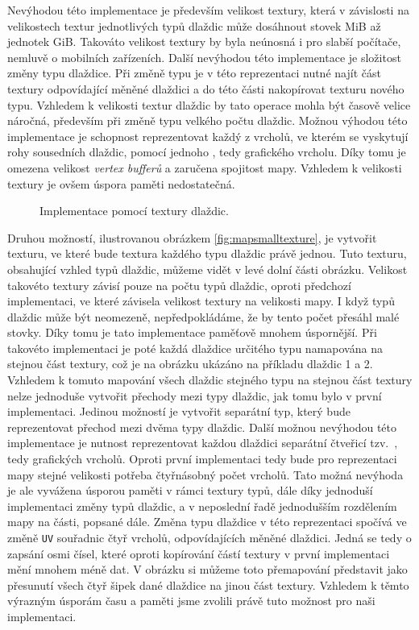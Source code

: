 Nevýhodou této implementace je především velikost textury, která v závislosti na velikostech textur jednotlivých typů dlaždic může dosáhnout stovek MiB až jednotek GiB. Takováto velikost textury by byla neúnosná i pro slabší počítače, nemluvě o mobilních zařízeních. Další nevýhodou této implementace je složitost změny typu dlaždice. Při změně typu je v této reprezentaci nutné najít část textury odpovídající měněné dlaždici a do této části nakopírovat texturu nového typu. Vzhledem k velikosti textur dlaždic by tato operace mohla být časově velice náročná, především při změně typu velkého počtu dlaždic. Možnou výhodou této implementace je schopnost reprezentovat každý z vrcholů, ve kterém se vyskytují rohy sousedních dlaždic, pomocí jednoho , tedy grafického vrcholu. Díky tomu je omezena velikost \textit{vertex bufferů} a zaručena spojitost mapy. Vzhledem k velikosti textury je ovšem úspora paměti nedostatečná.

\begin{figure}[h]
	\centering
	
	\caption{Implementace pomocí textury dlaždic.}
	\label{fig:mapbigtexture}
\end{figure}

Druhou možností, ilustrovanou obrázkem \ref{fig:mapsmalltexture}, je vytvořit texturu, ve které bude textura každého typu dlaždic právě jednou. Tuto texturu, obsahující vzhled typů dlaždic, můžeme vidět v levé dolní části obrázku. Velikost takovéto textury závisí pouze na počtu typů dlaždic, oproti předchozí implementaci, ve které závisela velikost textury na velikosti mapy. I když typů dlaždic může být neomezeně, nepředpokládáme, že by tento počet přesáhl malé stovky. Díky tomu je tato implementace paměťově mnohem úspornější. Při takovéto implementaci je poté každá dlaždice určitého typu namapována na stejnou část textury, což je na obrázku ukázáno na příkladu dlaždic 1 a 2. Vzhledem k tomuto mapování všech dlaždic stejného typu na stejnou část textury nelze jednoduše vytvořit přechody mezi typy dlaždic, jak tomu bylo v první implementaci. Jedinou možností je vytvořit separátní typ, který bude reprezentovat přechod mezi dvěma typy dlaždic. Další možnou nevýhodou této implementace je nutnost reprezentovat každou dlaždici separátní čtveřicí tzv.~, tedy grafických vrcholů. Oproti první implementaci tedy bude pro reprezentaci mapy stejné velikosti potřeba čtyřnásobný počet vrcholů. Tato možná nevýhoda je ale vyvážena úsporou paměti v rámci textury typů, dále díky jednoduší implementaci změny typů dlaždic, a v neposlední řadě jednodušším rozdělením mapy na části, popsané dále. Změna typu dlaždice v této reprezentaci spočívá ve změně \texttt{UV} souřadnic čtyř vrcholů, odpovídajících měněné dlaždici. Jedná se tedy o zapsání osmi čísel, které oproti kopírování částí textury v první implementaci mění mnohem méně dat. V obrázku si můžeme toto přemapování představit jako přesunutí všech čtyř šipek dané dlaždice na jinou část textury. Vzhledem k těmto výrazným úsporám času a paměti jsme zvolili právě tuto možnost pro naši implementaci.

